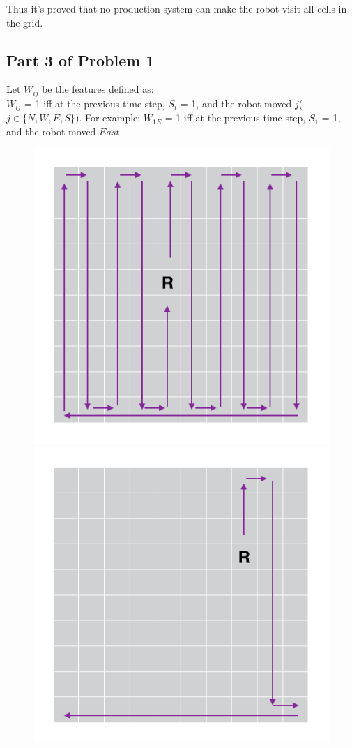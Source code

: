\documentclass[paper=a4, fontsize=11pt]{scrartcl} %
\numberwithin{equation}{section} %
\numberwithin{figure}{section} %
\numberwithin{table}{section} %
\begin{document}
Thus it's proved that no production system can make the robot visit all cells in the grid. \\

\subsection{Part 3 of Problem 1}

Let $W_{ij}$ be the features defined as:\\
$W_{ij}$ = 1 iff at the previous time step, $S_i$ = 1, and the robot moved $j$($j \in \{N, W, E, S\}$).
For example:
$W_{1E}$ = 1 iff at the previous time step, $S_1$ = 1, and the robot moved $East$.\\

\begin{figure}[h]
    \includegraphics[scale=0.5]{image3.png}
    \hspace{\fill}
    \includegraphics[scale=0.5]{image4.png}

\end{figure}
\end{document}
